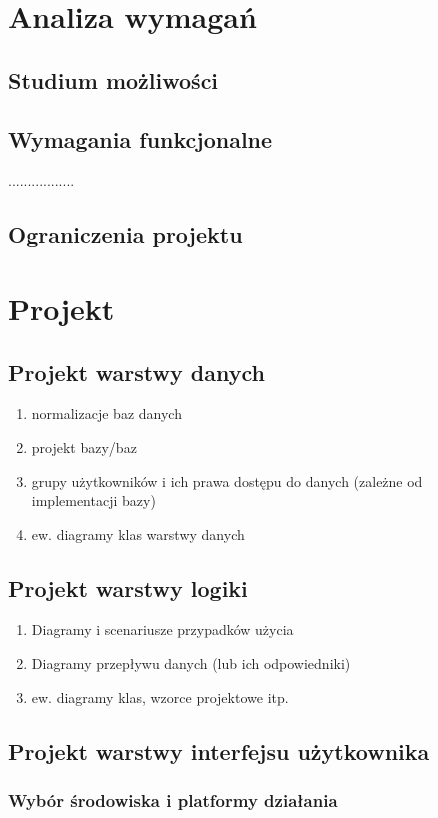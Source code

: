 \documentclass[twoside,12pt]{report}
\begin{document}
\section{Analiza wymagań}
\subsection{Studium możliwości}
\subsection{Wymagania funkcjonalne}
.................
\subsection{Ograniczenia projektu}

\section{Projekt}
\subsection{Projekt warstwy danych}

\begin{enumerate}
\item normalizacje baz danych
\item projekt bazy/baz 
\item grupy użytkowników i ich prawa dostępu do danych (zależne od implementacji bazy)
\item ew. diagramy klas warstwy danych
\end{enumerate}
\subsection{Projekt warstwy logiki}
\begin{enumerate}
\item Diagramy i scenariusze przypadków użycia
\item Diagramy przepływu danych (lub ich odpowiedniki)
\item ew. diagramy klas, wzorce projektowe itp.
\end{enumerate}

\subsection{Projekt warstwy interfejsu użytkownika}
\subsubsection{Wybór środowiska i platformy działania}
\end{document}
